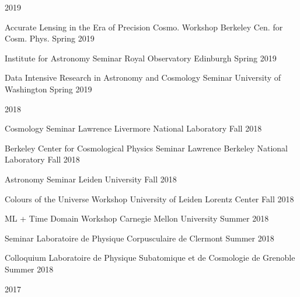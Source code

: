 \documentclass[11pt,letterpaper]{article}
\begin{document}
\begin{list}{}{\malzlist}
\item 2019
\nopagebreak\begin{list}{}{\malzlist}
	\item {}
	{Accurate Lensing in the Era of Precision Cosmo. Workshop}
	{Berkeley Cen. for Cosm. Phys.}
	{Spring 2019}
	\item {}
	{Institute for Astronomy Seminar}
	{Royal Observatory Edinburgh}
	{Spring 2019}
	\item {}
	{Data Intensive Research in Astronomy and Cosmology Seminar}
	{University of Washington}
	{Spring 2019}
\end{list}
\item 2018
\nopagebreak\begin{list}{}{\malzlist}
	\item {}
	{Cosmology Seminar}
	{Lawrence Livermore National Laboratory}
	{Fall 2018}
	\item {}
	{Berkeley Center for Cosmological Physics Seminar}
	{Lawrence Berkeley National Laboratory}
	{Fall 2018}
	\item {}
	{Astronomy Seminar}
	{Leiden University}
	{Fall 2018}
	\item {}
	{Colours of the Universe Workshop}
	{University of Leiden Lorentz Center}
	{Fall 2018}
	\item {}
	{ML + Time Domain Workshop}
	{Carnegie Mellon University}
	{Summer 2018}
	\item {}
	{Seminar}
	{Laboratoire de Physique Corpusculaire de Clermont}
	{Summer 2018}
	\item {}
	{Colloquium}
	{Laboratoire de Physique Subatomique et de Cosmologie de Grenoble}
	{Summer 2018}
\end{list}
\item 2017
\nopagebreak\begin{list}{}{\malzlist}
	\item {}

\end{list}
\end{list}
\end{document}
